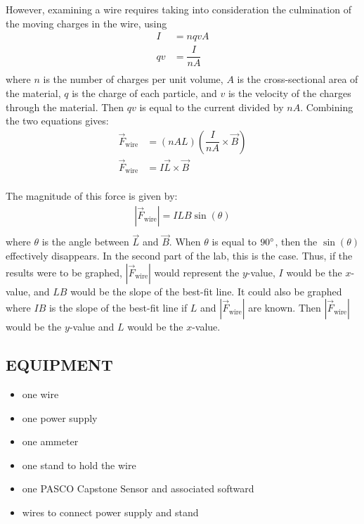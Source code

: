 \documentclass [12pt, letterpaper, twoside] {article}
\begin{document}
\noindent
However, examining a wire requires taking into consideration the culmination of the moving charges in the wire, using
\begin{equation}
  \begin{split}
    I &= nqvA \\
    qv &= \dfrac{I}{nA} \\ 
  \end{split}
\end{equation}
where \(n\) is the number of charges per unit volume, \(A\) is the cross-sectional area of the material, \(q\) is the charge of each particle, and \(v\) is the velocity of the charges through the material. Then \(qv\) is equal to the current divided by \(nA\). Combining the two equations gives:
\begin{equation*}
  \begin{split}
    \vec{F}_{\text{wire}} &= (nAL)\left(\dfrac{I}{nA}\times{\vec{B}}\right) \\
    \vec{F}_{\text{wire}} &= I\vec{L}\times\vec{B} \\
  \end{split}
\end{equation*}

\noindent
The magnitude of this force is given by:
\begin{equation*}
  \begin{split}
    |\vec{F}_{\text{wire}}| = ILB\sin(\theta) \\
  \end{split}
\end{equation*}
where \(\theta\) is the angle between \(\vec{L}\) and \(\vec{B}\). When \(\theta\) is equal to \(90\degree\), then the \(\sin(\theta)\) effectively disappears. In the second part of the lab, this is the case. Thus, if the results were to be graphed, \(|\vec{F}_{\text{wire}}|\) would represent the \(y\)-value, \(I\) would be the \(x\)-value, and \(LB\) would be the slope of the best-fit line. It could also be graphed where \(IB\) is the slope of the best-fit line if \(L\) and \(|\vec{F}_{\text{wire}}|\) are known. Then \(|\vec{F}_{\text{wire}}|\) would be the \(y\)-value and \(L\) would be the \(x\)-value.

\subsection* {EQUIPMENT}
  \noindent
  \begin {itemize}
    \itemsep0em
    \item {one wire}
    \item {one power supply}
    \item {one ammeter}
    \item {one stand to hold the wire}
    \item {one PASCO Capstone Sensor and associated softward}
    \item {wires to connect power supply and stand}
  \end {itemize}
\end{document}
